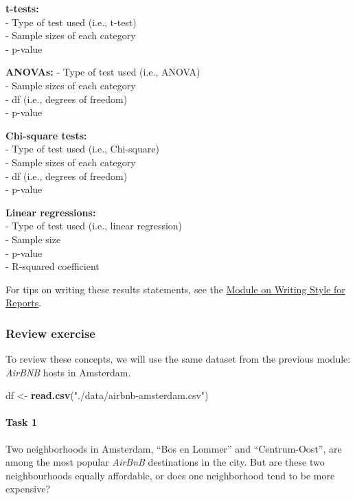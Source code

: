 \documentclass[
]{book}
\newenvironment{Shaded}{\begin{snugshade}}{\end{snugshade}}
\newcommand{\KeywordTok}[1]{\textcolor[rgb]{0.13,0.29,0.53}{\textbf{#1}}}
\newcommand{\NormalTok}[1]{#1}
\newcommand{\StringTok}[1]{\textcolor[rgb]{0.31,0.60,0.02}{#1}}
\begin{document}
\textbf{t-tests:}\\
- Type of test used (i.e., t-test)\\
- Sample sizes of each category\\
- p-value

\textbf{ANOVAs:}
- Type of test used (i.e., ANOVA)\\
- Sample sizes of each category\\
- df (i.e., degrees of freedom)\\
- p-value

\textbf{Chi-square tests:}\\
- Type of test used (i.e., Chi-square)\\
- Sample sizes of each category\\
- df (i.e., degrees of freedom)\\
- p-value

\textbf{Linear regressions:}\\
- Type of test used (i.e., linear regression)\\
- Sample size\\
- p-value\\
- R-squared coefficient

For tips on writing these results statements, see the \protect\hyperlink{style}{Module on Writing Style for Reports}.

\hypertarget{review-exercise-3}{%
\subsubsection*{Review exercise}\label{review-exercise-3}}

To review these concepts, we will use the same dataset from the previous module: \emph{AirBNB} hosts in Amsterdam.

\begin{Shaded}
\begin{Highlighting}[]
\NormalTok{df <-}\StringTok{ }\KeywordTok{read.csv}\NormalTok{(}\StringTok{"./data/airbnb-amsterdam.csv"}\NormalTok{)}
\end{Highlighting}
\end{Shaded}

\hypertarget{task-1}{%
\paragraph{Task 1}\label{task-1}}

Two neighborhoods in Amsterdam, ``Bos en Lommer'' and ``Centrum-Oost'', are among the most popular \emph{AirBnB} destinations in the city. But are these two neighbourhoods equally affordable, or does one neighborhood tend to be more expensive?
\end{document}
